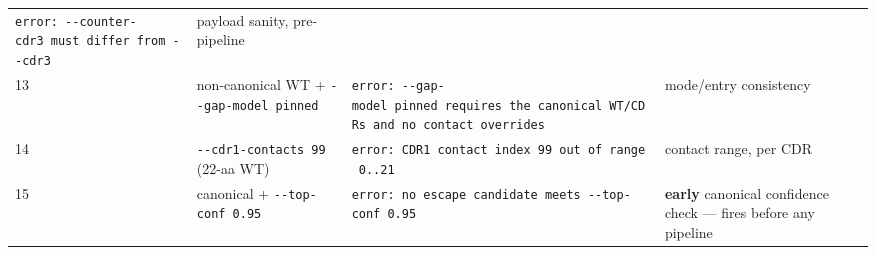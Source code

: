 \documentclass[12pt,a4paper]{article}
\begin{document}
\begin{longtable}[]{@{}llll@{}}
\begin{minipage}[t]{0.22\columnwidth}
\texttt{error:\ -\/-counter-cdr3\ must\ differ\ from\ -\/-cdr3}\strut
\end{minipage} & \begin{minipage}[t]{0.22\columnwidth}\raggedright
payload sanity, pre-pipeline\strut
\end{minipage}\tabularnewline
\begin{minipage}[t]{0.22\columnwidth}\raggedright
13\strut
\end{minipage} & \begin{minipage}[t]{0.22\columnwidth}\raggedright
non-canonical WT + \texttt{-\/-gap-model\ pinned}\strut
\end{minipage} & \begin{minipage}[t]{0.22\columnwidth}\raggedright
\texttt{error:\ -\/-gap-model\ pinned\ requires\ the\ canonical\ WT/CDRs\ and\ no\ contact\ overrides}\strut
\end{minipage} & \begin{minipage}[t]{0.22\columnwidth}\raggedright
mode/entry consistency\strut
\end{minipage}\tabularnewline
\begin{minipage}[t]{0.22\columnwidth}\raggedright
14\strut
\end{minipage} & \begin{minipage}[t]{0.22\columnwidth}\raggedright
\texttt{-\/-cdr1-contacts\ 99} (22-aa WT)\strut
\end{minipage} & \begin{minipage}[t]{0.22\columnwidth}\raggedright
\texttt{error:\ CDR1\ contact\ index\ 99\ out\ of\ range\ 0..21}\strut
\end{minipage} & \begin{minipage}[t]{0.22\columnwidth}\raggedright
contact range, per CDR\strut
\end{minipage}\tabularnewline
\begin{minipage}[t]{0.22\columnwidth}\raggedright
15\strut
\end{minipage} & \begin{minipage}[t]{0.22\columnwidth}\raggedright
canonical + \texttt{-\/-top-conf\ 0.95}\strut
\end{minipage} & \begin{minipage}[t]{0.22\columnwidth}\raggedright
\texttt{error:\ no\ escape\ candidate\ meets\ -\/-top-conf\ 0.95}\strut
\end{minipage} & \begin{minipage}[t]{0.22\columnwidth}\raggedright
\textbf{early} canonical confidence check --- fires before any pipeline

\end{minipage}
\end{longtable}
\end{document}
